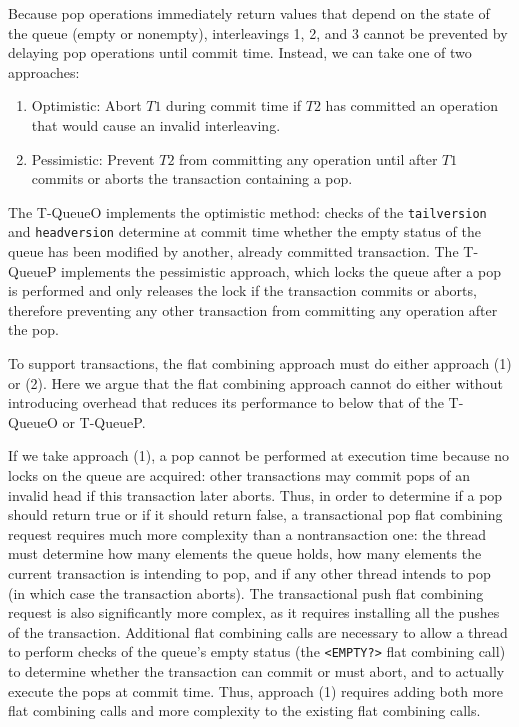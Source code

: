 Because pop operations immediately return values that depend on the state of the queue (empty or nonempty), interleavings 1, 2, and 3 cannot be prevented by delaying pop operations until commit time. Instead, we can take one of two approaches:
\begin{enumerate}
    \item Optimistic: Abort $T1$ during commit time if $T2$ has committed an operation that would cause an invalid interleaving.
    \item Pessimistic: Prevent $T2$ from committing any operation until after $T1$ commits or aborts the transaction containing a pop.
\end{enumerate}

The T-QueueO implements the optimistic method: checks of the \texttt{tailversion} and \texttt{headversion} determine at commit time whether the empty status of the queue has been modified by another, already committed transaction. The T-QueueP implements the pessimistic approach, which locks the queue after a pop is performed and only releases the lock if the transaction commits or aborts, therefore preventing any other transaction from committing any operation after the pop.

To support transactions, the flat combining approach must do either approach (1) or (2). Here we argue that the flat combining approach cannot do either without introducing overhead that reduces its performance to below that of the T-QueueO or T-QueueP.

If we take approach (1), a pop cannot be performed at execution time because no locks on the queue are acquired: other transactions may commit pops of an invalid head if this transaction later aborts. Thus, in order to determine if a pop should return true or if it should return false, a transactional pop flat combining request requires much more complexity than a nontransaction one: the thread must determine how many elements the queue holds, how many elements the current transaction is intending to pop, and if any other thread intends to pop (in which case the transaction aborts). The transactional push flat combining request is also significantly more complex, as it requires installing all the pushes of the transaction. Additional flat combining calls are necessary to allow a thread to perform checks of the queue's empty status (the \texttt{<EMPTY?>} flat combining call) to determine whether the transaction can commit or must abort, and to actually execute the pops at commit time. Thus, approach (1) requires adding both more flat combining calls and more complexity to the existing flat combining calls.

